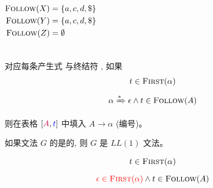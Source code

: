 \begin{frame}{}
  \begin{columns}
      
      \pause
      \begin{align*}
        \textsc{Follow}(X) &= \{a, c, d, \$\} \\
        \textsc{Follow}(Y) &= \{a, c, d, \$\} \\
        \textsc{Follow}(Z) &= \emptyset
      \end{align*}
  \end{columns}
\end{frame}

\begin{frame}{}
  \begin{center}

    \pause
    \vspace{0.80cm}
    对应每条产生式  与终结符 , 如果
    \begin{gather}
      t \in \textsc{First}(\alpha) \\[6pt]
      \alpha \xRightarrow[]{\ast} \epsilon \land t \in \textsc{Follow}(A)
    \end{gather}

    则在表格 $[\textcolor{purple}{A}, \textcolor{blue}{t}]$ 中填入 $A \to \alpha$ (编号)。

    \pause
    \vspace{0.80cm}
    \begin{definition}[$LL(1)$文法]
      如果文法 $G$ 的是的,
      则 $G$ 是 $LL(1)$ 文法。
    \end{definition}
  \end{center}
\end{frame}

\begin{frame}{}
  \begin{center}
    \setcounter{equation}{0}
    \begin{gather}
      t \in \textsc{First}(\alpha) \\[6pt]
      \textcolor{red}{\epsilon \in \textsc{First}(\alpha)} \land t \in \textsc{Follow}(A)
    \end{gather}

    \vspace{0.60cm}
  \end{center}
\end{frame}

